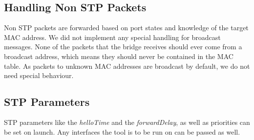 \subsection{Handling Non STP Packets}
Non STP packets are forwarded based on port states and knowledge of the target MAC address.
We did not implement any special handling for broadcast messages.
None of the packets that the bridge receives should ever come from a broadcast address, which means they should never be contained in the MAC table.
As packets to unknown MAC addresses are broadcast by default, we do not need special behaviour.


\subsection{STP Parameters}
STP parameters like the \textit{helloTime} and the \textit{forwardDelay}, as well as priorities can be set on launch.
Any interfaces the tool is to be run on can be passed as well.
